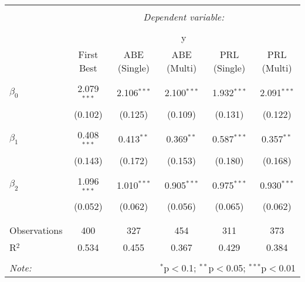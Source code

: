 
\begin{tabular}{@{\extracolsep{5pt}}lccccc} 
\\[-1.8ex]\hline 
\hline \\[-1.8ex] 
 & \multicolumn{5}{c}{\textit{Dependent variable:}} \\ 
\cline{2-6} 
\\[-1.8ex] & \multicolumn{5}{c}{y} \\ 
 & First Best & ABE (Single) & ABE (Multi) & PRL (Single) & PRL (Multi) \\ 
\hline \\[-1.8ex] 
 $\beta_0$ & 2.079$^{***}$ & 2.106$^{***}$ & 2.100$^{***}$ & 1.932$^{***}$ & 2.091$^{***}$ \\ 
  & (0.102) & (0.125) & (0.109) & (0.131) & (0.122) \\ 
  & & & & & \\ 
 $\beta_1$ & 0.408$^{***}$ & 0.413$^{**}$ & 0.369$^{**}$ & 0.587$^{***}$ & 0.357$^{**}$ \\ 
  & (0.143) & (0.172) & (0.153) & (0.180) & (0.168) \\ 
  & & & & & \\ 
 $\beta_2$ & 1.096$^{***}$ & 1.010$^{***}$ & 0.905$^{***}$ & 0.975$^{***}$ & 0.930$^{***}$ \\ 
  & (0.052) & (0.062) & (0.056) & (0.065) & (0.062) \\ 
  & & & & & \\ 
\hline \\[-1.8ex] 
Observations & 400 & 327 & 454 & 311 & 373 \\ 
R$^{2}$ & 0.534 & 0.455 & 0.367 & 0.429 & 0.384 \\ 
\hline 
\hline \\[-1.8ex] 
\textit{Note:}  & \multicolumn{5}{r}{$^{*}$p$<$0.1; $^{**}$p$<$0.05; $^{***}$p$<$0.01} \\ 
\end{tabular} 

